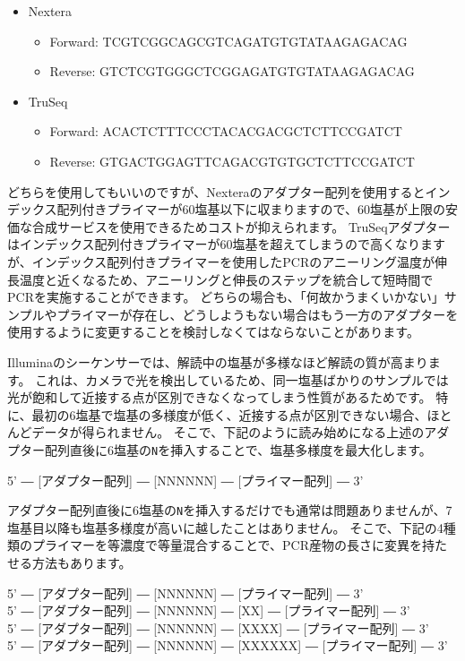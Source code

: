 \documentclass[titlepage,10pt,a4paper,uplatex]{jsbook}
\newenvironment{pre}{\begin{leftbar}\raggedright\ttfamily\footnotesize\setlength{\baselineskip}{1.4em}}{\end{leftbar}\vspace{-1em}}
\begin{document}
\begin{itemize}
\item Nextera
\begin{itemize}
\item Forward: TCGTCGGCAGCGTCAGATGTGTATAAGAGACAG
\item Reverse: GTCTCGTGGGCTCGGAGATGTGTATAAGAGACAG
\end{itemize}
\item TruSeq
\begin{itemize}
\item Forward: ACACTCTTTCCCTACACGACGCTCTTCCGATCT
\item Reverse: GTGACTGGAGTTCAGACGTGTGCTCTTCCGATCT
\end{itemize}
\end{itemize}

どちらを使用してもいいのですが、Nexteraのアダプター配列を使用するとインデックス配列付きプライマーが60塩基以下に収まりますので、60塩基が上限の安価な合成サービスを使用できるためコストが抑えられます。
TruSeqアダプターはインデックス配列付きプライマーが60塩基を超えてしまうので高くなりますが、インデックス配列付きプライマーを使用したPCRのアニーリング温度が伸長温度と近くなるため、アニーリングと伸長のステップを統合して短時間でPCRを実施することができます。
どちらの場合も、「何故かうまくいかない」サンプルやプライマーが存在し、どうしようもない場合はもう一方のアダプターを使用するように変更することを検討しなくてはならないことがあります。

Illuminaのシーケンサーでは、解読中の塩基が多様なほど解読の質が高まります。
これは、カメラで光を検出しているため、同一塩基ばかりのサンプルでは光が飽和して近接する点が区別できなくなってしまう性質があるためです。
特に、最初の6塩基で塩基の多様度が低く、近接する点が区別できない場合、ほとんどデータが得られません。
そこで、下記のように読み始めになる上述のアダプター配列直後に6塩基の\texttt{N}を挿入することで、塩基多様度を最大化します。

\begin{pre}
5' ― [アダプター配列] ― [NNNNNN] ― [プライマー配列] ― 3'
\end{pre}

アダプター配列直後に6塩基の\texttt{N}を挿入するだけでも通常は問題ありませんが、7塩基目以降も塩基多様度が高いに越したことはありません。
そこで、下記の4種類のプライマーを等濃度で等量混合することで、PCR産物の長さに変異を持たせる方法もあります。

\begin{pre}
5' ― [アダプター配列] ― [NNNNNN] ― [プライマー配列] ― 3'\\
5' ― [アダプター配列] ― [NNNNNN] ― [XX] ― [プライマー配列] ― 3'\\
5' ― [アダプター配列] ― [NNNNNN] ― [XXXX] ― [プライマー配列] ― 3'\\
5' ― [アダプター配列] ― [NNNNNN] ― [XXXXXX] ― [プライマー配列] ― 3'
\end{pre}
\end{document}
